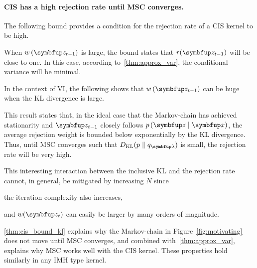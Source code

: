 \vspace{-0.1in}
\paragraph{CIS has a high rejection rate until MSC converges.}
The following bound provides a condition for the rejection rate of a CIS kernel to be high.
%

%
When \(w\,(\vz_{t-1})\) is large, the bound states that \(r(\vz_{t-1})\) will be close to one.
In this case, according to~\cref{thm:approx_var}, the conditional variance will be minimal.

In the context of VI, the following shows that \(w\,(\vz_{t-1})\) can be huge when the KL divergence is large.
%

%
This result states that, in the ideal case that the Markov-chain has achieved stationarity and \(\vz_{t-1}\) closely follows \(p\,(\vz\mid\vx)\), the average rejection weight is bounded below exponentially by the KL divergence.
Thus, until MSC converges such that \(\DKL{p}{q_{\vlambda}}\) is small, the rejection rate will be very high.

This interesting interaction between the inclusive KL and the rejection rate cannot, in general, be mitigated by increasing \(N\) since
\begin{enumerate*}[label=(\roman*)]
  \item the iteration complexity also increases,
  \item and \(w(\vz_t)\) can easily be larger by many orders of magnitude.
\end{enumerate*}
\cref{thm:cis_bound_kl} explains why the Markov-chain in Figure~\ref{fig:motivating} does not move until MSC converges, and combined with~\cref{thm:approx_var}, explains why MSC works well with the CIS kernel.
These properties hold similarly in any IMH type kernel.

\vspace{-0.1in}
